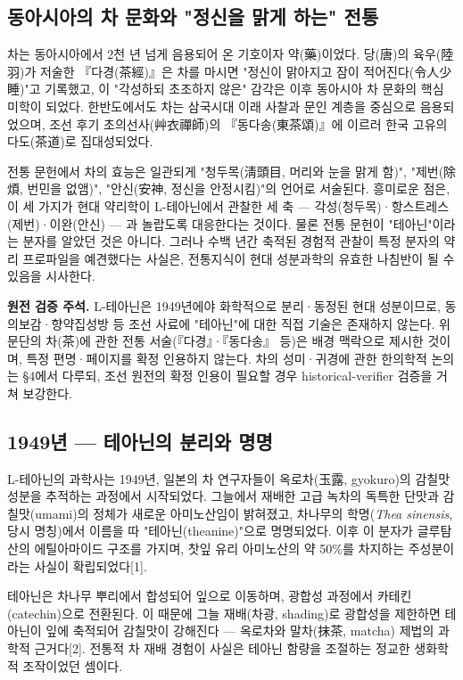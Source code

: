 \documentclass[11pt,oneside]{book}
\newenvironment{authnote}
  {\par\smallskip\begingroup\leftskip=7mm\rightskip=5mm\small\color{muted}\noindent\ignorespaces}
  {\par\endgroup\smallskip}
\begin{document}
\subsection{동아시아의 차 문화와 "정신을 맑게 하는" 전통}
차는 동아시아에서 2천 년 넘게 음용되어 온 기호이자 약(藥)이었다. 당(唐)의 육우(陸羽)가 저술한 『다경(茶經)』은 차를 마시면 "정신이 맑아지고 잠이 적어진다(令人少睡)"고 기록했고, 이 "각성하되 초조하지 않은" 감각은 이후 동아시아 차 문화의 핵심 미학이 되었다. 한반도에서도 차는 삼국시대 이래 사찰과 문인 계층을 중심으로 음용되었으며, 조선 후기 초의선사(艸衣禪師)의 『동다송(東茶頌)』에 이르러 한국 고유의 다도(茶道)로 집대성되었다.

전통 문헌에서 차의 효능은 일관되게 "청두목(淸頭目, 머리와 눈을 맑게 함)", "제번(除煩, 번민을 없앰)", "안신(安神, 정신을 안정시킴)"의 언어로 서술된다. 흥미로운 점은, 이 세 가지가 현대 약리학이 L-테아닌에서 관찰한 세 축 — 각성(청두목)·항스트레스(제번)·이완(안신) — 과 놀랍도록 대응한다는 것이다. 물론 전통 문헌이 "테아닌"이라는 분자를 알았던 것은 아니다. 그러나 수백 년간 축적된 경험적 관찰이 특정 분자의 약리 프로파일을 예견했다는 사실은, 전통지식이 현대 성분과학의 유효한 나침반이 될 수 있음을 시사한다.

\begin{authnote}\textbf{원전 검증 주석.} L-테아닌은 1949년에야 화학적으로 분리·동정된 현대 성분이므로, 동의보감·향약집성방 등 조선 사료에 "테아닌"에 대한 직접 기술은 존재하지 않는다. 위 문단의 차(茶)에 관한 전통 서술(『다경』·『동다송』 등)은 배경 맥락으로 제시한 것이며, 특정 편명·페이지를 확정 인용하지 않는다. 차의 성미·귀경에 관한 한의학적 논의는 §4에서 다루되, 조선 원전의 확정 인용이 필요할 경우 historical-verifier 검증을 거쳐 보강한다.\end{authnote}
\subsection{1949년 — 테아닌의 분리와 명명}
L-테아닌의 과학사는 1949년, 일본의 차 연구자들이 옥로차(玉露, gyokuro)의 감칠맛 성분을 추적하는 과정에서 시작되었다. 그늘에서 재배한 고급 녹차의 독특한 단맛과 감칠맛(umami)의 정체가 새로운 아미노산임이 밝혀졌고, 차나무의 학명(\textit{Thea sinensis}, 당시 명칭)에서 이름을 따 "테아닌(theanine)"으로 명명되었다. 이후 이 분자가 글루탐산의 에틸아마이드 구조를 가지며, 찻잎 유리 아미노산의 약 50\%를 차지하는 주성분이라는 사실이 확립되었다[1].

테아닌은 차나무 뿌리에서 합성되어 잎으로 이동하며, 광합성 과정에서 카테킨(catechin)으로 전환된다. 이 때문에 그늘 재배(차광, shading)로 광합성을 제한하면 테아닌이 잎에 축적되어 감칠맛이 강해진다 — 옥로차와 말차(抹茶, matcha) 제법의 과학적 근거다[2]. 전통적 차 재배 경험이 사실은 테아닌 함량을 조절하는 정교한 생화학적 조작이었던 셈이다.
\end{document}
